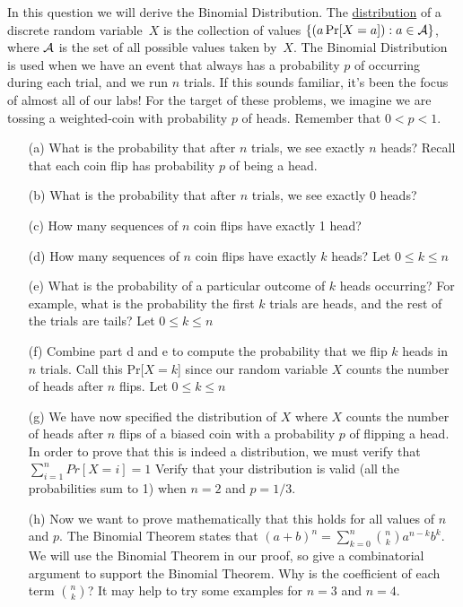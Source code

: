 \documentclass[]{article}
\begin{document}
\begin{qunlist}
In this question we will derive the Binomial Distribution. The \underline{distribution} of a discrete random variable~$X$ is the collection of values $\{(a \Pr[X=a]):a\in{\cal A}\}$, where ${\cal A}$ is the set of all possible values taken by~$X$. The Binomial Distribution is used when we have an event that always has a probability $p$ of occurring during each trial, and we run $n$ trials. If this sounds familiar, it's been the focus of almost all of our labs! For the target of these problems, we imagine we are tossing a weighted-coin with probability $p$ of heads. Remember that $0 < p < 1$.
\begin{enumerate}
\qpart
\item[(a)] What is the probability that after $n$ trials, we see exactly $n$ heads? Recall that each coin flip has probability $p$ of being a head.
\qpart
\item[(b)] What is the probability that after $n$ trials, we see exactly $0$ heads?
\qpart
\item[(c)] How many sequences of $n$ coin flips have exactly 1 head?
\qpart
\item[(d)] How many sequences of $n$ coin flips have exactly $k$ heads? Let  $0 \leq k \leq n$ 
\qpart
\item[(e)] What is the probability of a particular outcome of $k$ heads occurring? For example, what is the probability the first $k$ trials are heads, and the rest of the trials are tails? Let  $0 \leq k \leq n$ 
\qpart
\item[(f)] Combine part d and e to compute the probability that we flip $k$ heads in $n$ trials. Call this Pr[$X = k$] since our random variable $X$ counts the number of heads after $n$ flips. Let  $0 \leq k \leq n$ 
\qpart
\item[(g)] We have now specified the distribution of $X$ where $X$ counts the number of heads after $n$ flips of a biased coin with a probability $p$ of flipping a head. In order to prove that this is indeed a distribution, we must verify that $\sum\nolimits_{i=1}^n Pr[X=i] = 1$ Verify that your distribution is valid (all the probabilities sum to 1) when $n=2$ and $p=1/3$.
\qpart
\item[(h)] Now we want to prove mathematically that this holds for all values of $n$ and $p$. The Binomial Theorem states that $(a+b)^n = \sum\nolimits_{k=0}^n \binom{n}{k} a^{n-k}b^k $. We will use the Binomial Theorem in our proof, so give a combinatorial argument to support the Binomial Theorem. Why is the coefficient of each term $\binom{n}{k}$? It may help to try some examples for $n=3$ and $n=4$.

\end{enumerate}
\end{qunlist}
\end{document}
